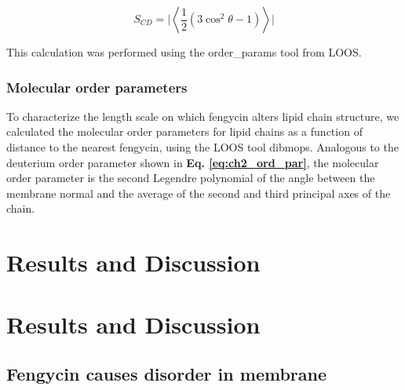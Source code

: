 \begin{equation}
\label{eq:ch2_ord_par}
S_{CD} = \bigg |\left\langle \frac{1}{2} \left( 3 \cos^2 \theta - 1 \right)\right\rangle \bigg |
\end{equation}

This calculation was performed using the order\_params tool from LOOS. \cite{Grossfield2014,Grossfield2009}

\subsubsection{Molecular order parameters}
\label{sss:ch2_dibmop}

To characterize the length scale on which fengycin alters lipid chain structure,
we calculated the molecular order parameters for lipid chains as a function of
distance to the nearest fengycin, using the LOOS tool dibmops.\cite{Grossfield2014,Grossfield2009}
Analogous to the deuterium order parameter shown in \textbf{Eq. \ref{eq:ch2_ord_par}},
the molecular order parameter is the second Legendre polynomial of the angle between the membrane normal
and the average of the second and third principal axes of the chain.

\section{Results and Discussion}

\section{Results and Discussion}
  
\label{s:ch2_results}
\subsection{Fengycin causes disorder in membrane}

\label{subsec:ch2_opara}

